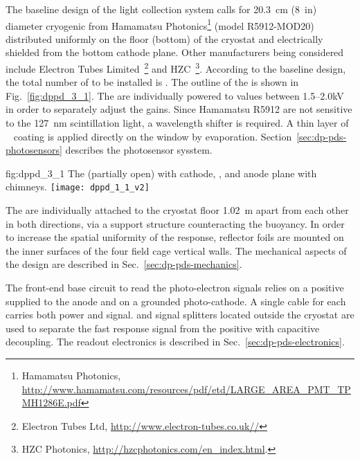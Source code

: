 The baseline design of the light collection system calls for \SI{20.3}{cm} (\SI{8}{in}) diameter cryogenic  from Hamamatsu Photonics\footnote{Hamamatsu Photonics\texttrademark{}, \url{http://www.hamamatsu.com/resources/pdf/etd/LARGE_AREA_PMT_TPMH1286E.pdf}} (model R5912-MOD20) distributed uniformly on the floor (bottom) of the cryostat and electrically shielded from the bottom cathode plane. Other  manufacturers being considered include Electron Tubes Limited~\footnote{Electron Tubes Ltd\texttrademark{}, \url{http://www.electron-tubes.co.uk//}} and HZC~\footnote{HZC Photonics\texttrademark{}, \url{http://hzcphotonics.com/en_index.html}.}. According to the baseline design, the total number of  to be installed is \dpnumpmtch. The outline of the  is shown in Fig.~\ref{fig:dppd_3_1}. The  are individually powered to values between \numrange{1.5}{2.0}\si{kV} in order to separately adjust the  gains. Since Hamamatsu R5912  are not sensitive to the \SI{127}{nm} scintillation light, a wavelength shifter is required. A thin layer of ~\cite{tpb} coating is applied directly on the  window by evaporation. Section~\ref{sec:dp-pds-photosensors} describes the photosensor sysstem.

\begin{dunefigure}{fig:dppd_3_1}
{The  (partially open) with cathode, ,  and anode plane with chimneys.}
\texttt{[image: dppd\_1\_1\_v2]}
\end{dunefigure}

The  are individually attached to the cryostat floor \SI{1.02}{m} apart from each other in both directions, via a  support structure counteracting the  buoyancy. In order to increase the spatial uniformity of the  response,  reflector foils are mounted on the inner surfaces of the four field cage vertical walls. The mechanical aspects of the  design are described in Sec.~\ref{sec:dp-pds-mechanics}.

The front-end  base circuit to read the photo-electron signals relies on a positive  supplied to the  anode and on a grounded photo-cathode. A single cable for each  carries both power and signal.  and signal splitters located outside the cryostat are used to separate the fast  response signal from the positive  with capacitive decoupling. The  readout electronics is described in Sec.~\ref{sec:dp-pds-electronics}.

